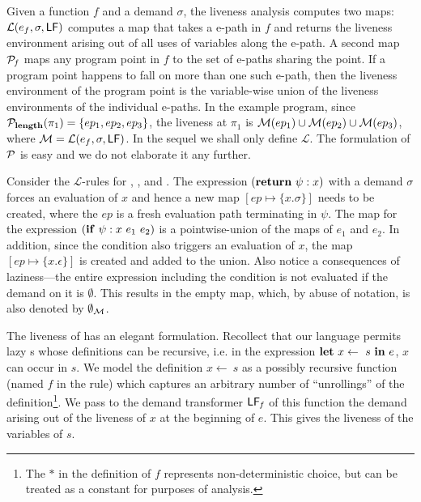 \documentclass[9pt]{sigplanconf}
\begin{document}
Given  a function  $\mathit{f}$ and  a demand  $\sigma$,  the liveness
analysis  computes  two   maps:  $\mathcal{L}(e_f,  \sigma,  \mathsf{LF})$
computes a  map that takes a  e-path in ${\mathit f}$  and returns the
liveness environment  arising out of  all uses of variables  along the
e-path.  A second map $\cal{P}_{\mathit  f}$ maps any program point in
$\mathit f$  to the set  of e-paths sharing  the point.  If  a program
point happens to fall on more  than one such e-path, then the liveness
environment of  the program  point is the  variable-wise union  of the
liveness  environments  of the  individual  e-paths.   In the  example
program,  since ${\mathcal P}_{\mathbf{length}}(\pi_1)  = \lbrace  ep_1, ep_2,
ep_3\rbrace$, the  liveness at $\pi_1$  is ${\cal M}(ep_1)  \cup {\cal
  M}(ep_2) \cup  {\cal M}(ep_3)$,  where ${\cal M}  = \mathcal{L}(e_f,
\sigma, \mathsf{LF})$.  In the  sequel we shall only define $\mathcal{L}$.
The formulation  of $\cal{P}$ is easy  and we do not  elaborate it any
further.

Consider  the $\mathcal{L}$-rules for  {\LET}, {\SIF},  and {\SRETURN}.
The  expression $(\mbox{$\mathbf{ return}$}~\psi:x)$  with a  demand $\sigma$  forces an
evaluation  of   $x$  and  hence  a  new   map  $[\mathit{ep}  \mapsto
  \{x.\sigma\}] $  needs to  be created, where the $ep$ is a fresh
evaluation path terminating in $\psi$.  The  map for  the expression
$(\mbox{$\mathbf{ if}$}~\psi:x~e_1~e_2)$ is a pointwise-union  of the maps of $e_1$ and
$e_2$. In addition, since the condition also triggers an evaluation of
$x$,  the map  $[\mathit{ep} \mapsto  \{x.\epsilon\}]$ is  created and
added  to the  union.  Also  notice a  consequences  of laziness---the
entire  expression including  the condition  is not  evaluated  if the
demand on it is $\emptyset$.  This results in the empty map, which, by
abuse of notation, is also denoted by $\emptyset_{\cal{M}}$.



 The liveness  of {\LET} has  an elegant formulation.   Recollect that
 our language permits lazy {\LET}s whose definitions can be recursive,
 i.e.  in the expression $\mbox{$\mathbf{ let}$}~x \leftarrow~s~\mbox{$\mathbf{ in}$}~e$, $x$ can occur in
 $s$.   We  model  the  definition  $x  \leftarrow~s$  as  a  possibly
 recursive function (named $\mathit{f}$ in the rule) which captures an
 arbitrary number of ``unrollings'' of the definition\footnote{The $*$
   in  the definition  of ${\mathit  f}$  represents non-deterministic
   choice,  but  can  be  treated   as  a  constant  for  purposes  of
   analysis.}.   We pass to  the demand  transformer $\mathsf{LF}_{\mathit
   f}$ of this function the demand  arising out of the liveness of $x$
 at the beginning of $e$. This  gives the liveness of the variables of
 $s$.
\end{document}
